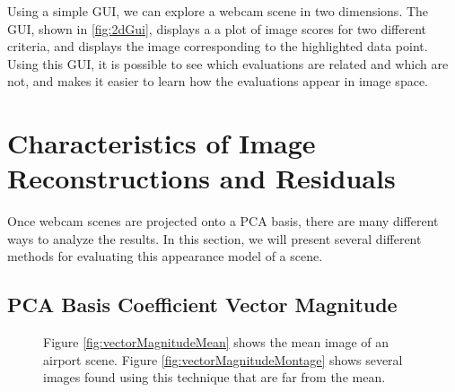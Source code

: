 Using a simple GUI, we can explore a webcam scene in two dimensions.  The GUI, shown in \ref{fig:2dGui}, displays a a plot of image scores for two different criteria, and displays the image corresponding to the highlighted data point.  Using this GUI, it is possible to see which evaluations are related and which are not, and makes it easier to learn how the evaluations appear in image space.


\section{Characteristics of Image Reconstructions and Residuals}

Once webcam scenes are projected onto a PCA basis, there are many different ways to analyze the results.  In this section, we will present several different methods for evaluating this appearance model of a scene.

\subsection{PCA Basis Coefficient Vector Magnitude}

\begin{figure}
	\centering
		\caption[PCA Basis Coefficient Vector Magnitude.]{Figure \ref{fig:vectorMagnitudeMean} shows the mean image of an airport scene. Figure \ref{fig:vectorMagnitudeMontage} shows several images found using this technique that are far from the mean.}
\end{figure}

